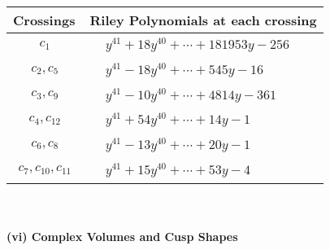 \documentclass[1p]{elsarticle_modified}
\theoremstyle{definition}
\begin{document}
\begin{tabular}{m{50pt}|m{274pt}}
Crossings & \hspace{64pt}Riley Polynomials at each crossing \\
\hline $$\begin{aligned}c_{1}\end{aligned}$$&$\begin{aligned}
&y^{41}+18 y^{40}+\cdots+181953 y-256
\end{aligned}$\\
\hline $$\begin{aligned}c_{2},c_{5}\end{aligned}$$&$\begin{aligned}
&y^{41}-18 y^{40}+\cdots+545 y-16
\end{aligned}$\\
\hline $$\begin{aligned}c_{3},c_{9}\end{aligned}$$&$\begin{aligned}
&y^{41}-10 y^{40}+\cdots+4814 y-361
\end{aligned}$\\
\hline $$\begin{aligned}c_{4},c_{12}\end{aligned}$$&$\begin{aligned}
&y^{41}+54 y^{40}+\cdots+14 y-1
\end{aligned}$\\
\hline $$\begin{aligned}c_{6},c_{8}\end{aligned}$$&$\begin{aligned}
&y^{41}-13 y^{40}+\cdots+20 y-1
\end{aligned}$\\
\hline $$\begin{aligned}c_{7},c_{10},c_{11}\end{aligned}$$&$\begin{aligned}
&y^{41}+15 y^{40}+\cdots+53 y-4
\end{aligned}$\\
\hline
\end{tabular}\\~\\
\newpage\flushleft \textbf{(vi) Complex Volumes and Cusp Shapes}
\end{document}
